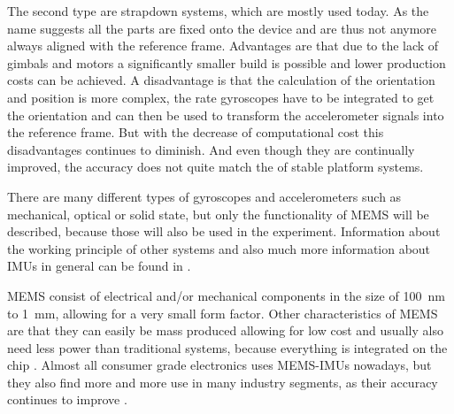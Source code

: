 The second type are strapdown systems, which are mostly used today.  
As the name suggests all the parts are fixed onto the device and are thus not anymore always aligned with the reference frame.
Advantages are that due to the lack of gimbals and motors a significantly smaller build is possible and lower production costs can be achieved.
A disadvantage is that the calculation of the orientation and position is more complex, the rate gyroscopes have to be integrated to get the orientation and can then be used to transform the accelerometer signals into the reference frame.
But with the decrease of computational cost this disadvantages continues to diminish. And even though they are continually improved, the accuracy does not quite match the of stable platform systems.

There are many different types of gyroscopes and accelerometers such as mechanical, optical or solid state, but only the functionality of MEMS will be described, because those will also be used in the experiment.
Information about the working principle of other systems and also much more information about IMUs in general can be found in \cite{Woodman07anintroduction}.

MEMS consist of electrical and/or mechanical components in the size of \SI{100}{\nano\metre} to \SI{1}{\milli\metre}, allowing for a very small form factor.
Other characteristics of MEMS are that they can easily be mass produced allowing for low cost and usually also need less power than traditional systems, because everything is integrated on the chip \cite{Shaeffer2013}.
Almost all consumer grade electronics uses MEMS-IMUs nowadays, but they also find more and more use in many industry segments, as their accuracy continues to improve \cite{Perlmutter2016}.

